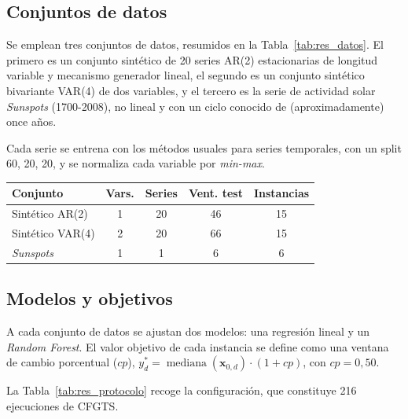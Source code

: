 \documentclass[12pt]{report} %
\begin{document}
\subsection{Conjuntos de datos}

Se emplean tres conjuntos de datos, resumidos en la Tabla~\ref{tab:res_datos}. El primero es un conjunto sintético de 20 series AR(2) estacionarias de longitud variable y mecanismo generador lineal, el segundo es un conjunto sintético bivariante VAR(4) de dos variables, y el tercero es la serie de actividad solar \textit{Sunspots} (1700-2008), no lineal y con un ciclo conocido de (aproximadamente) once años.

Cada serie se entrena con los métodos usuales para series temporales, con un split 60, 20, 20, y se normaliza cada variable por \textit{min-max}.

\begin{table}[H]
    {\begin{tabular}{|p{3.4cm}|c|c|c|c|}
            \hline
            \textbf{Conjunto} & \textbf{Vars.} & \textbf{Series} & \textbf{Vent. test} & \textbf{Instancias} \\
            \hline
            Sintético AR(2)   & 1              & 20              & 46                  & 15                  \\
            \hline
            Sintético VAR(4)  & 2              & 20              & 66                  & 15                  \\
            \hline
            \textit{Sunspots} & 1              & 1               & 6                   & 6                   \\
            \hline
        \end{tabular}}
\end{table}

\subsection{Modelos y objetivos}

A cada conjunto de datos se ajustan dos modelos: una regresión lineal y un \textit{Random Forest}. El valor objetivo de cada instancia se define como una ventana de cambio porcentual ($cp$), $y^{*}_d = \operatorname{mediana}(\mathbf{x}_{0,d}) \cdot (1 + cp)$, con $cp = 0{,}50$.

La Tabla~\ref{tab:res_protocolo} recoge la configuración, que constituye 216 ejecuciones de CFGTS.
\end{document}
